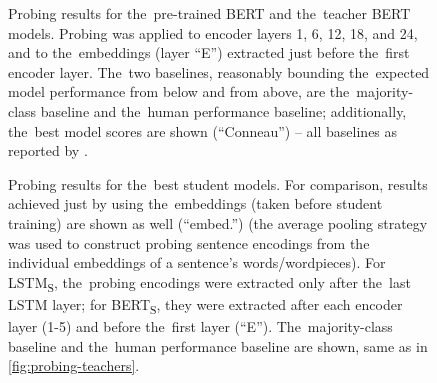 \documentclass[bsc,frontabs,singlespacing,parskip,deptreport]{infthesis}
\def\BERTS{BERT\textsubscript{S}}
\def\LSTMS{LSTM\textsubscript{S}}
\begin{document}
{{    \begin{figure}[h!b]
      \centering
      \cprotect\caption{Probing results for the~pre-trained BERT and the~teacher BERT models. Probing was applied to encoder layers 1, 6, 12, 18, and 24, and to the~embeddings (layer ``E'') extracted just before the~first encoder layer. The~two baselines, reasonably bounding the~expected model performance from below and from above, are the~majority-class baseline and the~human performance baseline; additionally, the~best model scores are shown (``Conneau'') -- all baselines as reported by \citet{Conneau_2018}.}
      \label{fig:probing-teachers}
    \end{figure}

    \begin{figure}[h!t]
      \centering
      \caption{Probing results for the~best student models. For comparison, results achieved just by using the~embeddings (taken before student training) are shown as well (``embed.'') (the average pooling strategy was used to construct probing sentence encodings from the individual embeddings of a sentence's words/wordpieces). For \LSTMS, the~probing encodings were extracted only after the~last LSTM layer; for \BERTS, they were extracted after each encoder layer (1-5) and before the~first layer (``E''). The~majority-class baseline and the~human performance baseline are shown, same as in \autoref{fig:probing-teachers}.}
      \label{fig:probing-students}
    \end{figure}

}}
\end{document}
